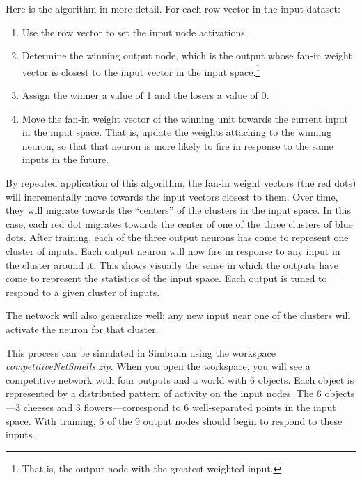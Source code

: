 Here is the algorithm in more detail. For each row vector in the input dataset:
\begin{enumerate}
\item Use the row vector to set the input node activations.
\item Determine the winning output node, which is the output whose fan-in weight vector is closest to the input vector in the input space.\footnote{That is, the output node with the greatest weighted input.} 
\item Assign the winner a value of 1 and the losers a value of 0.
\item Move the fan-in weight vector of the winning unit towards the current input in the input space. That is, update the weights attaching to the winning neuron, so that that neuron is more likely to fire in response to the same inputs in the future.
\end{enumerate}
By repeated application of this algorithm, the fan-in weight vectors (the red dots) will incrementally move towards the input vectors closest to them. Over time, they will migrate towards the ``centers'' of the clusters in the  input space. In this case, each red dot migrates towards the center of one of the three clusters of blue dots. After training, each of the three output neurons has come to represent one cluster of inputs. Each output neuron will now fire in response to any input in the cluster around it. This shows visually the sense in which the outputs have come to represent the statistics of the input space. Each output is tuned to respond to a given cluster of inputs. 

The network will also generalize well: any new input near one of the clusters will activate the neuron for that cluster. 

This process can be simulated in Simbrain using the workspace \emph{competitiveNetSmells.zip}. When you open the workspace, you will see a competitive network with four outputs and a world with 6 objects. Each object is represented by a distributed pattern of activity on the input nodes. The 6 objects---3 cheeses and 3 flowers---correspond to 6 well-separated points in the input space. With training, 6 of the 9 output nodes should begin to respond to these inputs.

